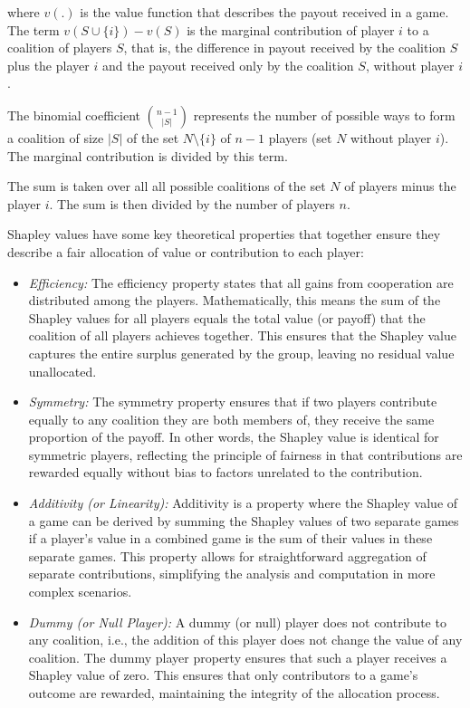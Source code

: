 where $v(.)$ is the value function that describes the payout received in a game. The term $v(S \cup \{i\}) - v(S)$ is the marginal contribution of player $i$ to a coalition of players $S$, that is, the difference in payout received by the coalition $S$ plus the player $i$ and the payout received only by the coalition $S$, without player $i$. 

The binomial coefficient $\binom{n-1}{|S|}$ represents the number of possible ways to form a coalition of size $|S|$ of the set $N \setminus \{i\}$ of $n-1$ players (set $N$ without player $i$). The marginal contribution is divided by this term. 

The sum is taken over all all possible coalitions of the set $N$ of players minus the player $i$. The sum is then divided by the number of players $n$.

Shapley values have some key theoretical properties that together ensure they describe a fair allocation of value or contribution to each player:

\begin{itemize}
    \item \emph{Efficiency:}
    The efficiency property states that all gains from cooperation are distributed among the players. Mathematically, this means the sum of the Shapley values for all players equals the total value (or payoff) that the coalition of all players achieves together. This ensures that the Shapley value captures the entire surplus generated by the group, leaving no residual value unallocated.

    \item \emph{Symmetry:}
    The symmetry property ensures that if two players contribute equally to any coalition they are both members of, they receive the same proportion of the payoff. In other words, the Shapley value is identical for symmetric players, reflecting the principle of fairness in that contributions are rewarded equally without bias to factors unrelated to the contribution.

    \item \emph{Additivity (or Linearity):}
    Additivity is a property where the Shapley value of a game can be derived by summing the Shapley values of two separate games if a player's value in a combined game is the sum of their values in these separate games. This property allows for straightforward aggregation of separate contributions, simplifying the analysis and computation in more complex scenarios.

    \item \emph{Dummy (or Null Player):}
    A dummy (or null) player does not contribute to any coalition, i.e., the addition of this player does not change the value of any coalition. The dummy player property ensures that such a player receives a Shapley value of zero. This ensures that only contributors to a game's outcome are rewarded, maintaining the integrity of the allocation process.
\end{itemize}

